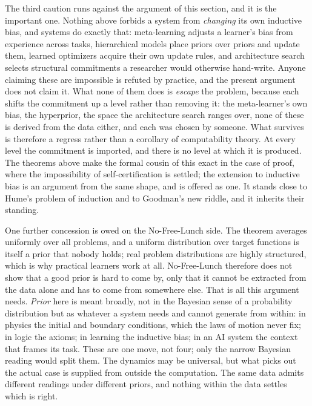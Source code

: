 \documentclass[11pt]{article}
\begin{document}
The third caution runs against the argument of this section, and it is the important one. Nothing
above forbids a system from \emph{changing} its own inductive bias, and systems do exactly that:
meta-learning adjusts a learner's bias from experience across tasks, hierarchical models place priors
over priors and update them, learned optimizers acquire their own update rules, and architecture
search selects structural commitments a researcher would otherwise hand-write. Anyone claiming these
are impossible is refuted by practice, and the present argument does not claim it. What none of them
does is \emph{escape} the problem, because each shifts the commitment up a level rather than removing
it: the meta-learner's own bias, the hyperprior, the space the architecture search ranges over, none
of these is derived from the data either, and each was chosen by someone. What survives is therefore a
regress rather than a corollary of computability theory. At every level the commitment is imported,
and there is no level at which it is produced. The theorems above make the formal cousin of this exact
in the case of proof, where the impossibility of self-certification is settled; the extension to
inductive bias is an argument from the same shape, and is offered as one. It stands close to Hume's
problem of induction and to Goodman's new riddle, and it inherits their standing.

One further concession is owed on the No-Free-Lunch side. The theorem averages uniformly over all
problems, and a uniform distribution over target functions is itself a prior that nobody holds; real
problem distributions are highly structured, which is why practical learners work at all. No-Free-Lunch
therefore does not show that a good prior is hard to come by, only that it cannot be extracted from the
data alone and has to come from somewhere else. That is all this argument needs. \emph{Prior} here is meant broadly, not in the Bayesian sense of a probability distribution but as
whatever a system needs and cannot generate from within: in physics the initial and boundary
conditions, which the laws of motion never fix; in logic the axioms; in learning the inductive bias;
in an AI system the context that frames its task. These are one move, not four; only the narrow
Bayesian reading would split them. The dynamics may be universal, but what picks out the actual case
is supplied from outside the computation. The same data admits different readings under different
priors, and nothing within the data settles which is right.
\end{document}
